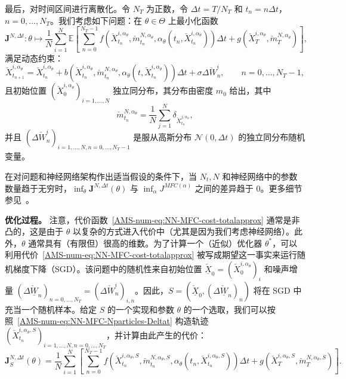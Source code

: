 \documentclass{amsproc}
\theoremstyle{definition}
\theoremstyle{remark}
\numberwithin{equation}{section}
\newcommand{\EE}{{\mathbb E}}
\newcommand{\bJ}{{\mathbf J}}
\newcommand{\ctrl}{\alpha}
\begin{document}
最后，对时间区间进行离散化。令 $N_T$ 为正数，令 $\Delta t = T/N_T$ 和 $t_n = n \Delta t$，$n =0,\dots, N_T$。我们考虑如下问题：在 $\theta \in \Theta$ 上最小化函数
\begin{equation}
\label{AMS-num-eq:NN-MFC-cost-totalapprox}
	\bJ^{N, \Delta t}: \theta \mapsto \frac{1}{N} \sum_{i=1}^N \EE \left[\sum_{n=0}^{N_T-1} f(\check X_{t_n}^{i, \ctrl_\theta}, \check m^{N, \ctrl_\theta}_{t_n}, \ctrl_\theta(t_n,\check X_{t_n}^{i, \ctrl_\theta}) ) \Delta t + g(\check X_T^{i, \ctrl_\theta}, \check m^{N,\ctrl_\theta}_T) \right],
\end{equation}
满足动态约束：
\begin{equation}
\label{AMS-num-eq:NN-MFC-Nparticles-Deltat}
	\check X_{t_{n+1}}^{i, \ctrl_\theta} = \check X_{t_{n}}^{i, \ctrl_\theta} + b( \check X_{t_{n}}^{i, \ctrl_\theta}, \check m^{N, \ctrl_\theta}_{t_{n}}, \ctrl_\theta(t, \check X_{t_{n}}^{i, \ctrl_\theta})) \Delta t + \sigma \Delta \check W^i_n, \qquad n = 0, \dots, N_T-1,
\end{equation}
且初始位置 $(\check X_0^{i, \ctrl_\theta})_{i=1,\dots,N}$ 独立同分布，其分布由密度 $m_0$ 给出，其中
$$
	\check m^{N, \ctrl_\theta}_{t_{n}} = \frac{1}{N} \sum_{j=1}^N \delta_{\check X_{t_{n}}^{j, \ctrl_\theta}}, 
$$ 
并且 $(\Delta \check W_n^i)_{i=1,\dots,N,n=0,\dots,N_T-1}$ 是服从高斯分布 $\mathcal N(0, \Delta t)$ 的独立同分布随机变量。


在对问题和神经网络架构作出适当假设的条件下，当 $N_t, N$ 和神经网络中的参数数量趋于无穷时，$\inf_\theta\bJ^{N, \Delta t}(\theta)$ 与 $\inf_\ctrl J^{MFC(\ctrl)}$ 之间的差异趋于 $0$。更多细节参见~\cite{carmona2019convergence2}。 


\textbf{优化过程。} 注意，代价函数~\eqref{AMS-num-eq:NN-MFC-cost-totalapprox} 通常是非凸的，这是由于 $\theta$ 以复杂的方式进入代价中（尤其是因为我们考虑神经网络）。此外，$\theta$ 通常具有（有限但）很高的维数。为了计算一个（近似）优化器 $\theta^*$，可以利用代价~\eqref{AMS-num-eq:NN-MFC-cost-totalapprox} 被写成期望这一事实来运行随机梯度下降（SGD）。该问题中的随机性来自初始位置 $\underline {\check X}_0 = (\check X_0^{i, \ctrl_\theta})_{i}$ 和噪声增量 $(\Delta \underline {\check W}_n)_{n=0,\dots,N_T} = (\Delta \check W_n^i)_{i,n}$。因此，$S = (\underline {\check X}_0, (\Delta \underline {\check W}_n)_{n})$ 将在 SGD 中充当一个随机样本。给定 $S$ 的一个实现和参数 $\theta$ 的一个选取，我们可以按照~\eqref{AMS-num-eq:NN-MFC-Nparticles-Deltat} 构造轨迹 $(\check X_{t_n}^{i, \ctrl_\theta,S})_{i=1,\dots,N, n=0,\dots,N_T}$，并计算由此产生的代价：
\begin{equation}
\label{AMS-num-eq:NN-MFC-cost-totalapprox-oneS}
	\bJ^{N, \Delta t}_S(\theta) = \frac{1}{N} \sum_{i=1}^N \left[\sum_{n=0}^{N_T-1} f(\check X_{t_n}^{i, \ctrl_\theta, S}, \check m^{N, \ctrl_\theta, S}_{t_n}, \ctrl_\theta(t_n,\check X_{t_n}^{i, \ctrl_\theta, S}) ) \Delta t + g(\check X_T^{i, \ctrl_\theta, S}, \check m^{N,\ctrl_\theta, S}_T) \right].
\end{equation}
\end{document}
